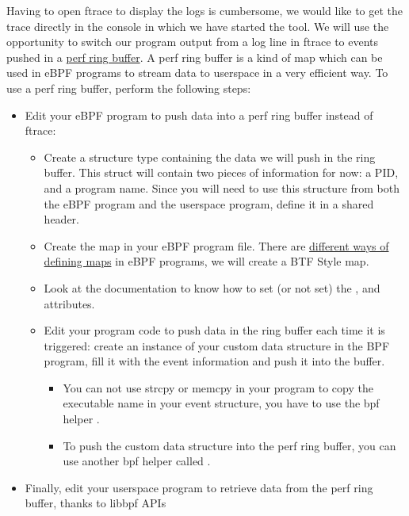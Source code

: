 Having to open ftrace to display the logs is cumbersome, we would like to get the trace directly in the console in which we have started the tool. We will use the opportunity to switch our program output from a log line in ftrace to events pushed in a \href{https://docs.kernel.org/6.6/bpf/ringbuf.html}{perf ring buffer}. A perf ring buffer is a kind of map which can be used in eBPF programs to stream data to userspace in a very efficient way. To use a perf ring buffer, perform the following steps:
\begin{itemize}
  \item Edit your eBPF program to push data into a perf ring buffer instead of ftrace:
  \begin{itemize}
    \item Create a structure type containing the data we will push in the ring buffer. This struct will contain two pieces of information for now: a PID, and a program name. Since you will need to use this structure from both the eBPF program and the userspace program, define it in a shared header.
    \item Create the map in your eBPF program file. There are
      \href{https://ebpf-docs.dylanreimerink.nl/linux/concepts/maps/}{different
        ways of defining maps} in eBPF programs, we will create a BTF Style
      map.
    \item Look at the
      \href{https://docs.ebpf.io/linux/map-type/BPF_MAP_TYPE_RINGBUF/}{}
      documentation to know how to set (or not set) the ,
       and  attributes.
    \item Edit your program code to push data in the ring buffer each time it is triggered: create an instance of your custom data structure in the BPF program, fill it with the event information and push it into the buffer.
    \begin{itemize}
      \item You can not use strcpy or memcpy in your program to copy the
      executable name in your event structure, you have to use the bpf helper .
      \item To push the custom data structure into the perf ring buffer, you can use another bpf helper called .
    \end{itemize}
  \end{itemize}
  \item Finally, edit your userspace program to retrieve data from the perf ring buffer, thanks to libbpf APIs

\end{itemize}
